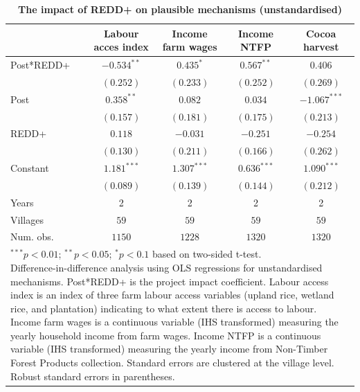 \documentclass[
]{article}
\begin{document}
\begin{table}[h]
\caption{\textbf{The impact of REDD+ on plausible mechanisms (unstandardised)}}
\begin{center}
\begin{tabular}{l c c c c}
\hline
 & Labour acces index & Income farm wages & Income NTFP & Cocoa harvest \\
\hline
Post*REDD+ & $-0.534^{**}$ & $0.435^{*}$   & $0.567^{**}$  & $0.406$        \\
           & $(0.252)$     & $(0.233)$     & $(0.252)$     & $(0.269)$      \\
Post       & $0.358^{**}$  & $0.082$       & $0.034$       & $-1.067^{***}$ \\
           & $(0.157)$     & $(0.181)$     & $(0.175)$     & $(0.213)$      \\
REDD+      & $0.118$       & $-0.031$      & $-0.251$      & $-0.254$       \\
           & $(0.130)$     & $(0.211)$     & $(0.166)$     & $(0.262)$      \\
Constant   & $1.181^{***}$ & $1.307^{***}$ & $0.636^{***}$ & $1.090^{***}$  \\
           & $(0.089)$     & $(0.139)$     & $(0.144)$     & $(0.212)$      \\
\hline
Years      & 2             & 2             & 2             & 2              \\
Villages   & $59$          & $59$          & $59$          & $59$           \\
Num. obs.  & $1150$        & $1228$        & $1320$        & $1320$         \\
\hline
\multicolumn{5}{l}{\scriptsize{\parbox{.9\linewidth}{\vspace{2pt}$^{***}p<0.01$; $^{**}p<0.05$; $^{*}p<0.1$ based on two-sided t-test.\\
       Difference-in-difference analysis using OLS regressions for unstandardised mechanisms. Post*REDD+ is the project impact coefficient. Labour access index is an index of three farm labour access variables (upland rice, wetland rice, and plantation) indicating to what extent there is access to labour. Income farm wages is a continuous variable (IHS transformed) measuring the yearly household income from farm wages. Income NTFP is a continuous variable (IHS transformed) measuring the yearly income from Non-Timber Forest Products collection. Standard errors are clustered at the village level. Robust standard errors in parentheses.}}}
\end{tabular}
\label{table:coefficients}
\end{center}
\end{table}
\end{document}
